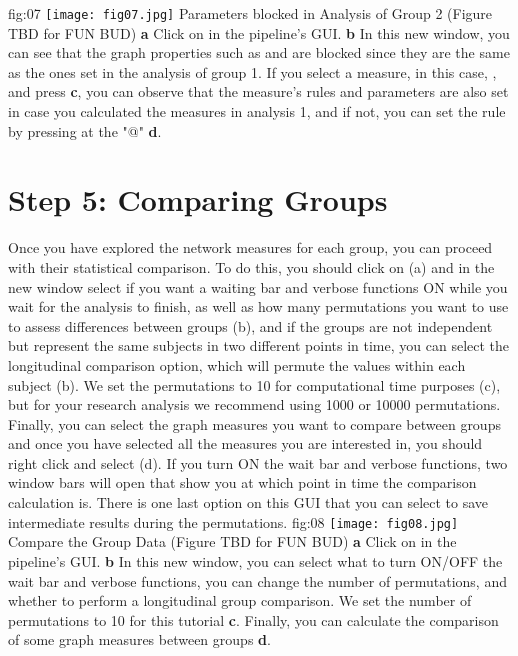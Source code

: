 \documentclass[justified]{tufte-handout}
\begin{document}
	{fig:07}
	{
	\texttt{[image: fig07.jpg]}
	}
	{Parameters blocked in Analysis of Group 2 (Figure TBD for FUN BUD)}
	{
	{\bf a} Click on  in the pipeline's GUI.
	{\bf b} In this new window, you can see that the graph properties such as  and  are blocked since they are the same as the ones set in the analysis of group 1. If you select a measure, in this case, , and press  {\bf c}, you can observe that the measure's rules and parameters are also set in case you calculated the measures in analysis 1, and if not, you can set the rule by pressing at the "@" {\bf d}.
	}
 
\section{Step 5: Comparing Groups}

Once you have explored the network measures for each group, you can proceed with their statistical comparison. To do this, you should click on  (a) and in the new window select if you want a waiting bar and verbose functions ON while you wait for the analysis to finish, as well as how many permutations you want to use to assess differences between groups ({b}), and if the groups are not independent but represent the same subjects in two different points in time, you can select the longitudinal comparison option, which will permute the values within each subject ({b}). We set the permutations to 10 for computational time purposes ({c}), but for your research analysis we recommend using 1000 or 10000 permutations. Finally, you can select the graph measures you want to compare between groups and once you have selected all the measures you are interested in, you should right click and select  ({d}). If you turn ON the wait bar and verbose functions, two window bars will open that show you at which point in time the comparison calculation is. There is one last option on this GUI that you can select to save intermediate results during the permutations.
	{fig:08}
	{
	\texttt{[image: fig08.jpg]}
	}
	{Compare the Group Data (Figure TBD for FUN BUD)}
	{
	{\bf a} Click on  in the pipeline's GUI.
	{\bf b} In this new window, you can select what to turn ON/OFF the wait bar and verbose functions, you can change the number of permutations, and whether to perform a longitudinal group comparison. We set the number of permutations to 10 for this tutorial {\bf c}. Finally, you can calculate the comparison of some graph measures between groups {\bf d}.
	}
 
\end{document}
